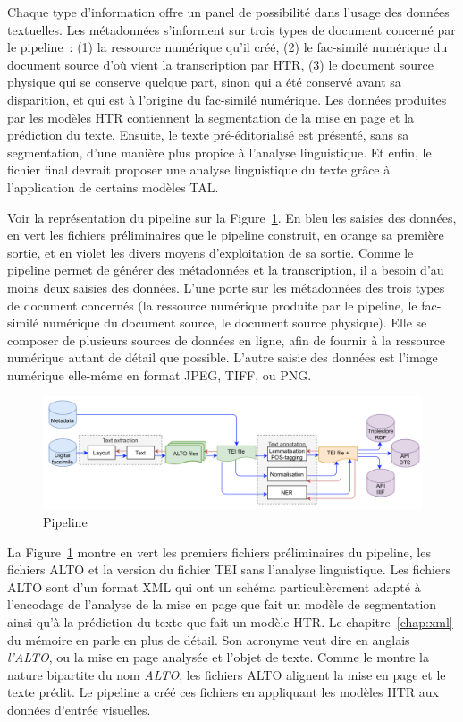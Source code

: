 \documentclass[class=article, crop=false]{standalone}
\begin{document}
Chaque type d'information offre un panel de possibilité dans l'usage des données textuelles. Les métadonnées s'informent sur trois types de document concerné par le pipeline~: (1) la ressource numérique qu'il créé, (2) le fac-similé numérique du document source d'où vient la transcription par \acrshort{HTR}, (3) le document source physique qui se conserve quelque part, sinon qui a été conservé avant sa disparition, et qui est à l'origine du fac-similé numérique. Les données produites par les modèles \acrshort{HTR} contiennent la segmentation de la mise en page et la prédiction du texte. Ensuite, le texte pré-éditorialisé est présenté, sans sa segmentation, d'une manière plus propice à l'analyse linguistique. Et enfin, le fichier final devrait proposer une analyse linguistique du texte grâce à l'application de certains modèles \acrshort{TAL}.

Voir la représentation du pipeline sur la Figure~\ref{fig:pipeline}. En bleu les saisies des données, en vert les fichiers préliminaires que le pipeline construit, en orange sa première sortie, et en violet les divers moyens d'exploitation de sa sortie. Comme le pipeline permet de générer des métadonnées et la transcription, il a besoin d'au moins deux saisies des données. L'une porte sur les métadonnées des trois types de document concernés (la ressource numérique produite par le pipeline, le fac-similé numérique du document source, le document source physique). Elle se composer de plusieurs sources de données en ligne, afin de fournir à la ressource numérique autant de détail que possible. L'autre saisie des données est l'image numérique elle-même en format JPEG, TIFF, ou PNG.

\begin{figure}[hbt!]
\includegraphics[width=\textwidth]{../../../images/pipeline.png}
\caption{Pipeline}
\label{fig:pipeline}
\end{figure}

La Figure~\ref{fig:pipeline} montre en vert les premiers fichiers préliminaires du pipeline, les fichiers \acrshort{ALTO} et la version du fichier \acrshort{TEI} sans l'analyse linguistique. Les fichiers \acrshort{ALTO} sont d'un format \acrshort{XML} qui ont un schéma particulièrement adapté à l'encodage de l'analyse de la mise en page que fait un modèle de segmentation ainsi qu'à la prédiction du texte que fait un modèle \acrshort{HTR}. Le chapitre~\ref{chap:xml} du mémoire en parle en plus de détail. Son acronyme veut dire en anglais \textit{l'\acrlong{ALTO}}, ou la mise en page analysée et l'objet de texte. Comme le montre la nature bipartite du nom \textit{\acrlong{ALTO}}, les fichiers \acrshort{ALTO} alignent la mise en page et le texte prédit. Le pipeline a créé  ces fichiers en appliquant les modèles \acrshort{HTR} aux données d'entrée visuelles.
\end{document}
